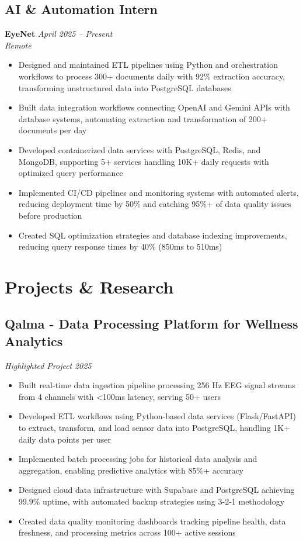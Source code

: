 \documentclass[7.5pt,a4paper]{article}
\newcommand{\experience}[4]{
\subsection*{#1}
\textbf{#2} \hfill \textit{#3} \\
\textit{#4}
}
\newcommand{\project}[3]{
\subsection*{#1}
\textit{#2} \hfill \textit{#3}
}
\begin{document}
\experience{AI \& Automation Intern}{EyeNet}{April 2025 -- Present}{Remote}
\begin{itemize}
\item Designed and maintained ETL pipelines using Python and orchestration workflows to process 300+ documents daily with 92\% extraction accuracy, transforming unstructured data into PostgreSQL databases
\item Built data integration workflows connecting OpenAI and Gemini APIs with database systems, automating extraction and transformation of 200+ documents per day
\item Developed containerized data services with PostgreSQL, Redis, and MongoDB, supporting 5+ services handling 10K+ daily requests with optimized query performance
\item Implemented CI/CD pipelines and monitoring systems with automated alerts, reducing deployment time by 50\% and catching 95\%+ of data quality issues before production
\item Created SQL optimization strategies and database indexing improvements, reducing query response times by 40\% (850ms to 510ms)
\end{itemize}

\section*{Projects \& Research}

\project{Qalma - Data Processing Platform for Wellness Analytics}{Highlighted Project}{2025}
\begin{itemize}
\item Built real-time data ingestion pipeline processing 256 Hz EEG signal streams from 4 channels with <100ms latency, serving 50+ users
\item Developed ETL workflows using Python-based data services (Flask/FastAPI) to extract, transform, and load sensor data into PostgreSQL, handling 1K+ daily data points per user
\item Implemented batch processing jobs for historical data analysis and aggregation, enabling predictive analytics with 85\%+ accuracy
\item Designed cloud data infrastructure with Supabase and PostgreSQL achieving 99.9\% uptime, with automated backup strategies using 3-2-1 methodology
\item Created data quality monitoring dashboards tracking pipeline health, data freshness, and processing metrics across 100+ active sessions
\end{itemize}
\end{document}
